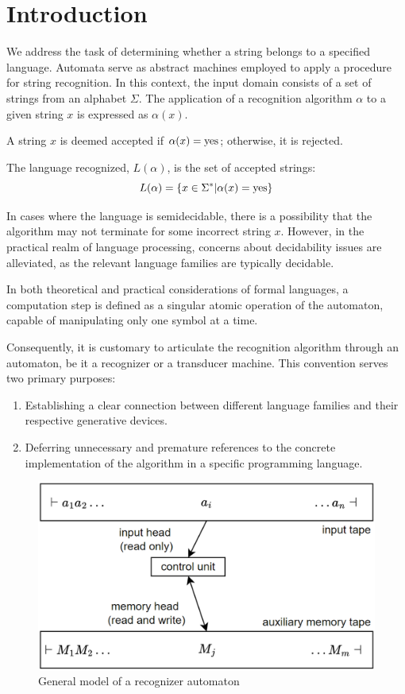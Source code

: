 \section{Introduction}

We address the task of determining whether a string belongs to a specified language. 
Automata serve as abstract machines employed to apply a procedure for string recognition.
In this context, the input domain consists of a set of strings from an alphabet $\Sigma$.
The application of a recognition algorithm $\alpha$ to a given string $x$ is expressed as $\alpha(x)$.
\begin{definition}
    A string $x$ is deemed accepted if $\alpha(x) = \textnormal{yes}$; otherwise, it is rejected.
\end{definition}
\begin{definition}
    The language recognized, $L(\alpha)$, is the set of accepted strings:
    \[L(\alpha)=\{x \in \Sigma^{*}|\alpha(x)=\textnormal{yes}\}\]
\end{definition}
In cases where the language is semidecidable, there is a possibility that the algorithm may not terminate for some incorrect string $x$.
However, in the practical realm of language processing, concerns about decidability issues are alleviated, as the relevant language families are typically decidable.
\begin{definition}
    In both theoretical and practical considerations of formal languages, a computation step is defined as a singular atomic operation of the automaton, capable of manipulating only one symbol at a time. 
\end{definition}
Consequently, it is customary to articulate the recognition algorithm through an automaton, be it a recognizer or a transducer machine. 
This convention serves two primary purposes:
\begin{enumerate}
    \item Establishing a clear connection between different language families and their respective generative devices.
    \item Deferring unnecessary and premature references to the concrete implementation of the algorithm in a specific programming language.
\end{enumerate}
\begin{figure}[H]
    \centering
    \includegraphics[width=0.5\linewidth]{images/fsa.png}
    \caption{General model of a recognizer automaton}
\end{figure}

